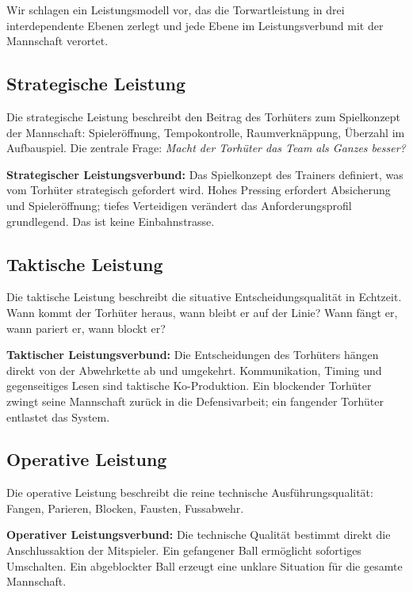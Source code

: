 \documentclass[12pt,a4paper]{article}
\begin{document}
Wir schlagen ein Leistungsmodell vor, das die Torwartleistung in drei interdependente Ebenen zerlegt und jede Ebene im Leistungsverbund mit der Mannschaft verortet.


\subsection{Strategische Leistung}
\label{sec:strategisch}

Die strategische Leistung beschreibt den Beitrag des Torh\"uters zum Spielkonzept der Mannschaft: Spieler\"offnung, Tempokontrolle, Raumverkn\"appung, \"Uberzahl im Aufbauspiel. Die zentrale Frage: \emph{Macht der Torh\"uter das Team als Ganzes besser?}

\textbf{Strategischer Leistungsverbund:} Das Spielkonzept des Trainers definiert, was vom Torh\"uter strategisch gefordert wird. Hohes Pressing erfordert Absicherung und Spieler\"offnung; tiefes Verteidigen ver\"andert das Anforderungsprofil grundlegend. Das ist keine Einbahnstrasse.


\subsection{Taktische Leistung}
\label{sec:taktisch}

Die taktische Leistung beschreibt die situative Entscheidungsqualit\"at in Echtzeit. Wann kommt der Torh\"uter heraus, wann bleibt er auf der Linie? Wann f\"angt er, wann pariert er, wann blockt er?

\textbf{Taktischer Leistungsverbund:} Die Entscheidungen des Torh\"uters h\"angen direkt von der Abwehrkette ab und umgekehrt. Kommunikation, Timing und gegenseitiges Lesen sind taktische Ko-Produktion. Ein blockender Torh\"uter zwingt seine Mannschaft zur\"uck in die Defensivarbeit; ein fangender Torh\"uter entlastet das System.


\subsection{Operative Leistung}
\label{sec:operativ}

Die operative Leistung beschreibt die reine technische Ausf\"uhrungsqualit\"at: Fangen, Parieren, Blocken, Fausten, Fussabwehr.

\textbf{Operativer Leistungsverbund:} Die technische Qualit\"at bestimmt direkt die Anschlussaktion der Mitspieler. Ein gefangener Ball erm\"oglicht sofortiges Umschalten. Ein abgeblockter Ball erzeugt eine unklare Situation f\"ur die gesamte Mannschaft.
\end{document}
